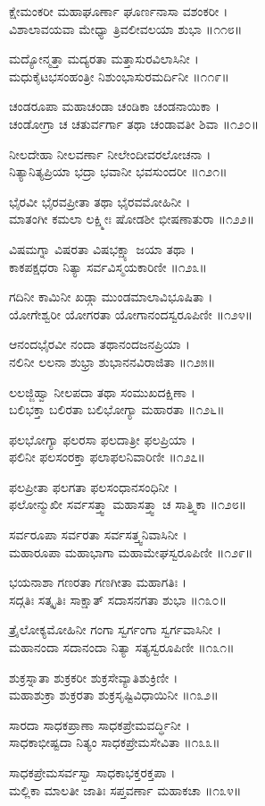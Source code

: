 ಕ್ಷೇಮಂಕರೀ ಮಹಾಘೂರ್ಣಾ ಘೂರ್ಣನಾಸಾ ವಶಂಕರೀ ।\\
ವಿಶಾಲಾವಯವಾ ಮೇಧ್ಯಾ ತ್ರಿವಲೀವಲಯಾ ಶುಭಾ ॥೧೧೮॥

ಮದ್ಯೋನ್ಮತ್ತಾ ಮದ್ಯರತಾ ಮತ್ತಾಸುರವಿಲಾಸಿನೀ ।\\
ಮಧುಕೈಟಭಸಂಹಂತ್ರೀ ನಿಶುಂಭಾಸುರಮರ್ದಿನೀ ॥೧೧೯॥

ಚಂಡರೂಪಾ ಮಹಾಚಂಡಾ ಚಂಡಿಕಾ ಚಂಡನಾಯಿಕಾ ।\\
ಚಂಡೋಗ್ರಾ ಚ ಚತುರ್ವರ್ಗಾ ತಥಾ ಚಂಡಾವತೀ ಶಿವಾ ॥೧೨೦॥

ನೀಲದೇಹಾ ನೀಲವರ್ಣಾ ನೀಲೇಂದೀವರಲೋಚನಾ ।\\
ನಿತ್ಯಾನಿತ್ಯಪ್ರಿಯಾ ಭದ್ರಾ ಭವಾನೀ ಭವಸುಂದರೀ ॥೧೨೧॥

ಭೈರವೀ ಭೈರವಪ್ರೀತಾ ತಥಾ ಭೈರವಮೋಹಿನೀ ।\\
ಮಾತಂಗೀ ಕಮಲಾ ಲಕ್ಷ್ಮೀಃ ಷೋಡಶೀ ಭೀಷಣಾತುರಾ ॥೧೨೨॥

ವಿಷಮಗ್ನಾ ವಿಷರತಾ ವಿಷಭಕ್ಷ್ಯಾ ಜಯಾ ತಥಾ ।\\
ಕಾಕಪಕ್ಷಧರಾ ನಿತ್ಯಾ ಸರ್ವವಿಸ್ಮಯಕಾರಿಣೀ ॥೧೨೩॥

ಗದಿನೀ ಕಾಮಿನೀ ಖಡ್ಗಾ ಮುಂಡಮಾಲಾವಿಭೂಷಿತಾ ।\\
ಯೋಗೇಶ್ವರೀ ಯೋಗರತಾ ಯೋಗಾನಂದಸ್ವರೂಪಿಣೀ ॥೧೨೪॥

ಆನಂದಭೈರವೀ ನಂದಾ ತಥಾನಂದಜನಪ್ರಿಯಾ ।\\
ನಲಿನೀ ಲಲನಾ ಶುಭ್ರಾ ಶುಭಾನನವಿರಾಜಿತಾ ॥೧೨೫॥

ಲಲಜ್ಜಿಹ್ವಾ ನೀಲಪದಾ ತಥಾ ಸಂಮುಖದಕ್ಷಿಣಾ ।\\
ಬಲಿಭಕ್ತಾ ಬಲಿರತಾ ಬಲಿಭೋಗ್ಯಾ ಮಹಾರತಾ ॥೧೨೬॥

ಫಲಭೋಗ್ಯಾ ಫಲರಸಾ ಫಲದಾತ್ರೀ ಫಲಪ್ರಿಯಾ ।\\
ಫಲಿನೀ ಫಲಸಂರಕ್ತಾ ಫಲಾಫಲನಿವಾರಿಣೀ ॥೧೨೭॥

ಫಲಪ್ರೀತಾ ಫಲಗತಾ ಫಲಸಂಧಾನಸಂಧಿನೀ ।\\
ಫಲೋನ್ಮುಖೀ ಸರ್ವಸತ್ತ್ವಾ ಮಹಾಸತ್ತ್ವಾ ಚ ಸಾತ್ತ್ವಿಕಾ ॥೧೨೮॥

ಸರ್ವರೂಪಾ ಸರ್ವರತಾ ಸರ್ವಸತ್ತ್ವನಿವಾಸಿನೀ ।\\
ಮಹಾರೂಪಾ ಮಹಾಭಾಗಾ ಮಹಾಮೇಘಸ್ವರೂಪಿಣೀ ॥೧೨೯॥

ಭಯನಾಶಾ ಗಣರತಾ ಗಣಗೀತಾ ಮಹಾಗತಿಃ ।\\
ಸದ್ಗತಿಃ ಸತ್ಕೃತಿಃ ಸಾಕ್ಷಾತ್ ಸದಾಸನಗತಾ ಶುಭಾ ॥೧೩೦॥

ತ್ರೈಲೋಕ್ಯಮೋಹಿನೀ ಗಂಗಾ ಸ್ವರ್ಗಂಗಾ ಸ್ವರ್ಗವಾಸಿನೀ ।\\
ಮಹಾನಂದಾ ಸದಾನಂದಾ ನಿತ್ಯಾ ಸತ್ಯಸ್ವರೂಪಿಣೀ ॥೧೩೧॥

ಶುಕ್ರಸ್ನಾತಾ ಶುಕ್ರಕರೀ ಶುಕ್ರಸೇವ್ಯಾತಿಶುಕ್ರಿಣೀ ।\\
ಮಹಾಶುಕ್ರಾ ಶುಕ್ರರತಾ ಶುಕ್ರಸೃಷ್ಟಿವಿಧಾಯಿನೀ ॥೧೩೨॥

ಸಾರದಾ ಸಾಧಕಪ್ರಾಣಾ ಸಾಧಕಪ್ರೇಮವರ್ದ್ಧಿನೀ ।\\
ಸಾಧಕಾಭೀಷ್ಟದಾ ನಿತ್ಯಂ ಸಾಧಕಪ್ರೇಮಸೇವಿತಾ ॥೧೩೩॥

ಸಾಧಕಪ್ರೇಮಸರ್ವಸ್ವಾ ಸಾಧಕಾಭಕ್ತರಕ್ತಪಾ ।\\
ಮಲ್ಲಿಕಾ ಮಾಲತೀ ಜಾತಿಃ ಸಪ್ತವರ್ಣಾ ಮಹಾಕಚಾ ॥೧೩೪॥

